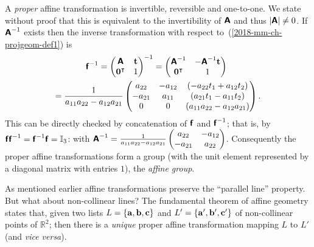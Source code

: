 A {\em proper} affine transformation is invertible, reversible and one-to-one.
We state without proof that this is equivalent to the
invertibility of $\textsf{\textbf{A}}$  and thus  $\left| \textsf{\textbf{A}} \right| \neq 0$.
If $\textsf{\textbf{A}}^{-1}$ exists then
the inverse transformation with respect to~(\ref{2018-mm-ch-projgeom-def1})    is
\begin{equation}
\begin{split}
\textsf{\textbf{f}}^{-1}     =
\begin{pmatrix}
\textsf{\textbf{A}}&{\bf t}\\
{\bf 0}^\intercal &1
\end{pmatrix}^{-1}
=
\begin{pmatrix}
\textsf{\textbf{A}}^{-1} &-\textsf{\textbf{A}}^{-1} {\bf t}\\
{\bf 0}^\intercal &1
\end{pmatrix}
 \qquad    \qquad
\\
=
\frac{1}{a_{11}a_{22}-a_{12}a_{21}}
\begin{pmatrix}
a_{22}&-a_{12} & (- a_{22} t_1 + a_{12}t_2)\\
-a_{21}&a_{11} &   (a_{21} t_1 - a_{11}t_2)\\
0&0 &(a_{11}a_{22}-a_{12}a_{21})
\end{pmatrix}
.
\end{split}
\label{2018-mm-ch-projgeom-def1inv}
\end{equation}
This can be
directly
checked by concatenation of
$\textsf{\textbf{f}}$ and $\textsf{\textbf{f}}^{-1}$; that is, by
$\textsf{\textbf{f}} \textsf{\textbf{f}}^{-1}=\textsf{\textbf{f}}^{-1} \textsf{\textbf{f}}=\mathbb{I}_3$:
with
$\textsf{\textbf{A}}^{-1} = \frac{1}{a_{11}a_{22}-a_{12}a_{21}}\begin{pmatrix}
a_{22}&-a_{12}\\
-a_{21}&a_{22}
\end{pmatrix}$.
Consequently the proper affine transformations form a group (with the unit element represented by a diagonal matrix with entries $1$), the {\em affine group}.

As mentioned earlier affine transformations preserve
the ``parallel line'' property. But what about non-collinear lines?
The fundamental theorem of affine geometry\cite{Stothers-ag}
states that,
given two lists
$L=\{{\bf a},{\bf b},{\bf c}\}$
and
$L'=\{{\bf a}',{\bf b}',{\bf c}'\}$
of non-collinear
points of $\mathbb{R}^2$;
then there is a {\em unique}  proper affine transformation  mapping $L$ to $L'$ (and {\it vice versa}).


